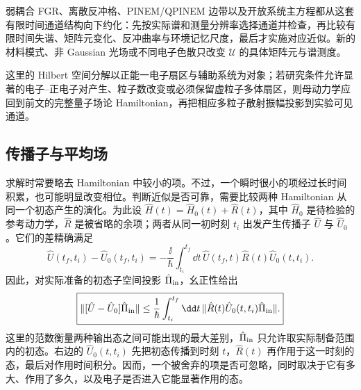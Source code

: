 弱耦合 FGR、离散反冲格、PINEM/QPINEM 边带以及开放系统主方程都从这套有限时间通道结构向下约化：先按实际谱和测量分辨率选择通道并检查，再比较有限时间失谐、矩阵元变化、反冲曲率与环境记忆尺度，最后才实施对应近似。新的材料模式、非 Gaussian 光场或不同电子色散只改变 $\mathscr U$ 的具体矩阵元与谱测度。

这里的 Hilbert 空间分解以正能一电子扇区与辅助系统为对象；若研究条件允许显著的电子--正电子对产生、粒子数改变或必须保留虚粒子多体扇区，则母动力学应回到前文的完整量子场论 Hamiltonian，再把相应多粒子散射振幅投影到实验可见通道。



\subsection{传播子与平均场}

求解时常要略去 Hamiltonian 中较小的项。不过，一个瞬时很小的项经过长时间积累，也可能明显改变相位。判断近似是否可靠，需要比较两种 Hamiltonian 从同一个初态产生的演化。为此设
$\hat H(t)=\hat H_0(t)+\hat R(t)$，其中 $\hat H_0$ 是待检验的参考动力学，$\hat R$ 是被省略的余项；两者从同一初时刻 $t_i$ 出发产生传播子 $\hat U$ 与 $\hat U_0$。它们的差精确满足
\begin{equation}
\boxed{
\hat U(t_f,t_i)-\hat U_0(t_f,t_i)
=-\frac{\ii}{\hbar}\int_{t_i}^{t_f}\dd t\,
\hat U(t_f,t)\hat R(t)\hat U_0(t,t_i).}
\label{eq:duhamel_master_identity}
\end{equation}
因此，对实际准备的初态子空间投影 $\hat\Pi_{\rm in}$，幺正性给出
\begin{equation}
\boxed{
\|[\hat U-\hat U_0]\hat\Pi_{\rm in}\|
\le
\frac1\hbar\int_{t_i}^{t_f}\dd t\,
\|\hat R(t)\hat U_0(t,t_i)\hat\Pi_{\rm in}\|.}
\label{eq:duhamel_projected_bound}
\end{equation}
这里的范数衡量两种输出态之间可能出现的最大差别，$\hat\Pi_{\rm in}$ 只允许取实际制备范围内的初态。右边的 $\hat U_0(t,t_i)$ 先把初态传播到时刻 $t$，$\hat R(t)$ 再作用于这一时刻的态，最后对作用时间积分。因而，一个被舍弃的项是否可忽略，同时取决于它有多大、作用了多久，以及电子是否进入它能显著作用的态。

